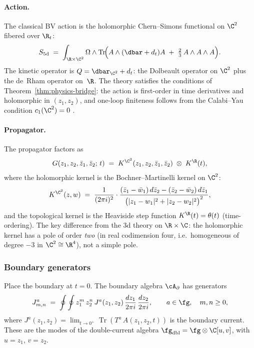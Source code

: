 \paragraph{Action.}
The classical BV action is the holomorphic Chern--Simons
functional on $\C^2$ fibered over $\R_t$:
\begin{equation}\label{eq:5d-HT-action}
 S_{\mathrm{5d}}
 \;=\;
 \int_{\R\times\C^2}
 \Omega \wedge
 \operatorname{Tr}\!\Bigl(
 A \wedge (\dbar + d_t) A
 \;+\; \tfrac{2}{3}\, A \wedge A \wedge A
 \Bigr).
\end{equation}
The kinetic operator is $Q = \dbar_{\C^2} + d_t$: the
Dolbeault operator on $\C^2$ plus the de~Rham operator
on~$\R$. The theory satisfies the conditions of
Theorem~\ref{thm:physics-bridge}: the action is
first-order in time derivatives and holomorphic in
$(z_1,z_2)$, and one-loop finiteness follows from the
Calabi--Yau condition $c_1(\C^2) = 0$
\cite{costello-renormalization}.

\paragraph{Propagator.}
The propagator factors as
\begin{equation}\label{eq:5d-propagator}
 G(z_1,z_2,\bar z_1,\bar z_2;\, t)
 \;=\;
 K^{\C^2}(z_1,z_2,\bar z_1,\bar z_2)
 \;\otimes\;
 K^{\R}(t),
\end{equation}
where the holomorphic kernel is the Bochner--Martinelli
kernel on $\C^2$:
\[
 K^{\C^2}(z,w)
 \;=\;
 \frac{1}{(2\pi i)^2}
 \cdot
 \frac{(\bar z_1 - \bar w_1)\,d\bar z_2
 - (\bar z_2 - \bar w_2)\,d\bar z_1}
 {\bigl(|z_1-w_1|^2 + |z_2-w_2|^2\bigr)^2},
\]
and the topological kernel is the Heaviside step function
$K^{\R}(t) = \theta(t)$ (time-ordering). The key
difference from the 3d theory on $\R \times \C$: the
holomorphic kernel has a pole of order \emph{two}
(in real codimension four, i.e.\
homogeneous of degree $-3$ in $\C^2 \cong \R^4$),
not a simple pole.

\subsubsection{Boundary generators}

Place the boundary at $t = 0$. The boundary algebra
$\cA_\partial$ has generators
\[
 J^a_{m,n}
 \;=\;
 \oint\oint
 z_1^m\, z_2^n\, J^a(z_1,z_2)\,
 \frac{dz_1}{2\pi i}\, \frac{dz_2}{2\pi i},
 \qquad a \in \fg,\quad m,n \ge 0,
\]
where $J^a(z_1,z_2) = \lim_{t\to 0^+}
\operatorname{Tr}(T^a\, A(z_1,z_2,t))$ is the
boundary current. These are the modes of the
double-current algebra
$\fg_{\mathrm{dbl}} = \fg\otimes\C[u,v]$,
with $u = z_1$, $v = z_2$.

